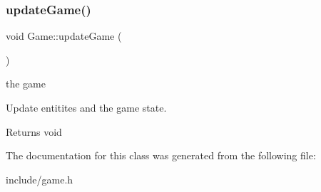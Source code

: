 \subsubsection{\texorpdfstring{update\+Game()}{updateGame()}}
{\footnotesize\ttfamily void Game\+::update\+Game (\begin{DoxyParamCaption}{ }\end{DoxyParamCaption})}

the game

Update entitites and the game state.

\begin{DoxyReturn}{Returns}
void 
\end{DoxyReturn}


The documentation for this class was generated from the following file\+:\begin{DoxyCompactItemize}
\item 
include/game.\+h\end{DoxyCompactItemize}
